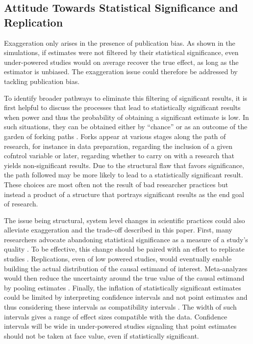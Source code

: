 \documentclass[usletter, 12pt]{article}
\begin{document}
				
	\subsection{Attitude Towards Statistical Significance and Replication}
	
		Exaggeration only arises in the presence of publication bias. As shown in the simulations, if estimates were not filtered by their statistical significance, even under-powered studies would on average recover the true effect, as long as the estimator is unbiased. The exaggeration issue could therefore be addressed by tackling publication bias. 
		
		To identify broader pathways to eliminate this filtering of significant results, it is first helpful to discuss the processes that lead to statistically significant results when power and thus the probability of obtaining a significant estimate is low. In such situations, they can be obtained either by ``chance'' or as an outcome of the garden of forking paths \citep{simmons_false-positive_2011, gelman_garden_2013, kasy_forking_2021}. Forks appear at various stages along the path of research, for instance in data preparation, regarding the inclusion of a given cofntrol variable or later, regarding whether to carry on with a research that yields non-significant results. Due to the structural flaw that favors significance, the path followed may be more likely to lead to a statistically significant result. These choices are most often not the result of bad researcher practices but instead a product of a structure that portrays significant results as the end goal of research. 
		
		The issue being structural, system level changes in scientific practices could also alleviate exaggeration and the trade-off described in this paper. First, many researchers advocate abandoning statistical significance as a measure of a study's quality \citep{mcshane_abandon_2019}. To be effective, this change should be paired with an effort to replicate studies \citep{christensen_transparency_2018}. Replications, even of low powered studies, would eventually enable building the actual distribution of the causal estimand of interest. Meta-analyzes would then reduce the uncertainty around the true value of the causal estimand by pooling estimates \citep{hernan_causal_2021}. Finally, the inflation of statistically significant estimates could be limited by interpreting confidence intervals and not point estimates and thus considering these intervals as compatibility intervals \citep{shadish_experimental_2002, amrhein_inferential_2019, romer_praise_2020}. The width of such intervals gives a range of effect sizes compatible with the data. Confidence intervals will be wide in under-powered studies signaling that point estimates should not be taken at face value, even if statistically significant.
\end{document}
